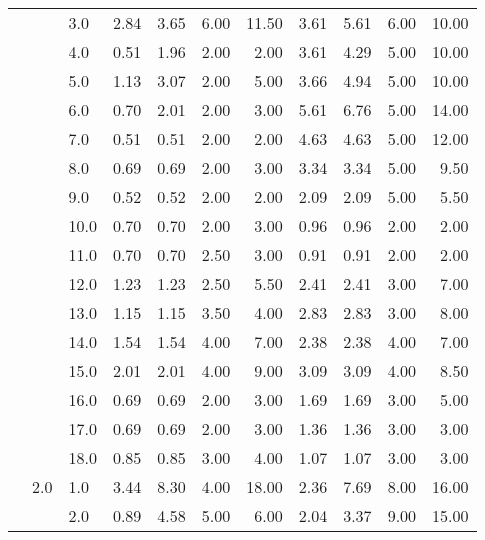 \begin{tabular}{lllrrrrrrrr}
          &     & 3.0  &       2.84 &      3.65 &  6.00 &  11.50 &       3.61 &      5.61 &  6.00 &  10.00 \\
          &     & 4.0  &       0.51 &      1.96 &  2.00 &   2.00 &       3.61 &      4.29 &  5.00 &  10.00 \\
          &     & 5.0  &       1.13 &      3.07 &  2.00 &   5.00 &       3.66 &      4.94 &  5.00 &  10.00 \\
          &     & 6.0  &       0.70 &      2.01 &  2.00 &   3.00 &       5.61 &      6.76 &  5.00 &  14.00 \\
          &     & 7.0  &       0.51 &      0.51 &  2.00 &   2.00 &       4.63 &      4.63 &  5.00 &  12.00 \\
          &     & 8.0  &       0.69 &      0.69 &  2.00 &   3.00 &       3.34 &      3.34 &  5.00 &   9.50 \\
          &     & 9.0  &       0.52 &      0.52 &  2.00 &   2.00 &       2.09 &      2.09 &  5.00 &   5.50 \\
          &     & 10.0 &       0.70 &      0.70 &  2.00 &   3.00 &       0.96 &      0.96 &  2.00 &   2.00 \\
          &     & 11.0 &       0.70 &      0.70 &  2.50 &   3.00 &       0.91 &      0.91 &  2.00 &   2.00 \\
          &     & 12.0 &       1.23 &      1.23 &  2.50 &   5.50 &       2.41 &      2.41 &  3.00 &   7.00 \\
          &     & 13.0 &       1.15 &      1.15 &  3.50 &   4.00 &       2.83 &      2.83 &  3.00 &   8.00 \\
          &     & 14.0 &       1.54 &      1.54 &  4.00 &   7.00 &       2.38 &      2.38 &  4.00 &   7.00 \\
          &     & 15.0 &       2.01 &      2.01 &  4.00 &   9.00 &       3.09 &      3.09 &  4.00 &   8.50 \\
          &     & 16.0 &       0.69 &      0.69 &  2.00 &   3.00 &       1.69 &      1.69 &  3.00 &   5.00 \\
          &     & 17.0 &       0.69 &      0.69 &  2.00 &   3.00 &       1.36 &      1.36 &  3.00 &   3.00 \\
          &     & 18.0 &       0.85 &      0.85 &  3.00 &   4.00 &       1.07 &      1.07 &  3.00 &   3.00 \\
          & 2.0 & 1.0  &       3.44 &      8.30 &  4.00 &  18.00 &       2.36 &      7.69 &  8.00 &  16.00 \\
          &     & 2.0  &       0.89 &      4.58 &  5.00 &   6.00 &       2.04 &      3.37 &  9.00 &  15.00 \\

\end{tabular}
